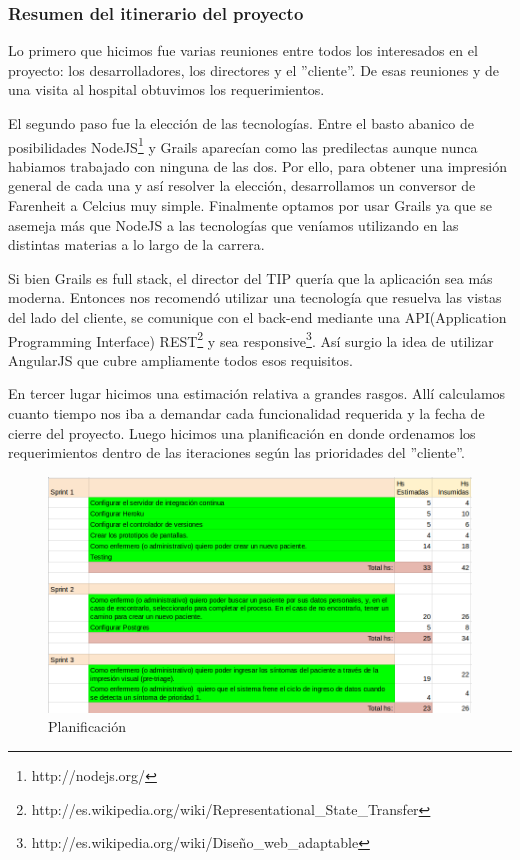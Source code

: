 \subsubsection{Resumen del itinerario del proyecto}
Lo primero que hicimos fue varias reuniones entre todos los interesados en el proyecto: los desarrolladores, los directores y el ''cliente''. De esas reuniones y de una visita al hospital obtuvimos los requerimientos.

El segundo paso fue la elección de las tecnologías. Entre el basto abanico de posibilidades NodeJS\footnote{http://nodejs.org/} y Grails aparecían como las predilectas aunque nunca habiamos trabajado con ninguna de las dos. Por ello, para obtener una impresión general de cada una y así resolver la elección, desarrollamos un conversor de Farenheit a Celcius muy simple. Finalmente optamos por usar Grails ya que se asemeja más que NodeJS a las tecnologías que veníamos utilizando en las distintas materias a lo largo de la carrera.

Si bien Grails es full stack, el director del TIP quería que la aplicación sea más moderna. Entonces nos recomendó utilizar una tecnología que resuelva las vistas del lado del cliente, se comunique con el back-end mediante una API(Application Programming Interface) REST\footnote{http://es.wikipedia.org/wiki/Representational\_State\_Transfer} 
y sea responsive\footnote{http://es.wikipedia.org/wiki/Diseño\_web\_adaptable}. Así surgio la idea de utilizar AngularJS que cubre ampliamente todos esos requisitos.

En tercer lugar hicimos una estimación relativa a grandes rasgos. Allí calculamos cuanto tiempo nos iba a demandar cada funcionalidad requerida y la fecha de cierre del proyecto. Luego hicimos una planificación en donde ordenamos los requerimientos dentro de las iteraciones según las prioridades del ''cliente''.

\begin{figure}[h]
  \centerline{\includegraphics[width=1.2\textwidth]{planificacion.png}}
  \caption{Planificación}
\end{figure}

